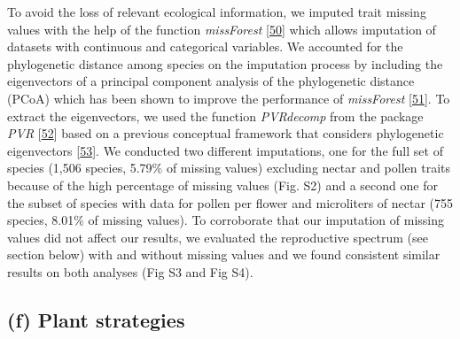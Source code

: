 \documentclass[
  12pt,
  a4paper,
]{article}
\begin{document}
To avoid the loss of relevant ecological information, we imputed trait missing values with the help of the function \emph{missForest} {[}\protect\hyperlink{ref-stekhoven2012}{50}{]} which allows imputation of datasets with continuous and categorical variables. We accounted for the phylogenetic distance among species on the imputation process by including the eigenvectors of a principal component analysis of the phylogenetic distance (PCoA) which has been shown to improve the performance of \emph{missForest} {[}\protect\hyperlink{ref-penone2014}{51}{]}. To extract the eigenvectors, we used the function \emph{PVRdecomp} from the package \emph{PVR} {[}\protect\hyperlink{ref-santos2018}{52}{]} based on a previous conceptual framework that considers phylogenetic eigenvectors {[}\protect\hyperlink{ref-diniz-filho2012}{53}{]}. We conducted two different imputations, one for the full set of species (1,506 species, 5.79\% of missing values) excluding nectar and pollen traits because of the high percentage of missing values (Fig. S2) and a second one for the subset of species with data for pollen per flower and microliters of nectar (755 species, 8.01\% of missing values). To corroborate that our imputation of missing values did not affect our results, we evaluated the reproductive spectrum (see section below) with and without missing values and we found consistent similar results on both analyses (Fig S3 and Fig S4).

\hypertarget{f-plant-strategies}{%
\subsection{(f) Plant strategies}\label{f-plant-strategies}}
\end{document}
